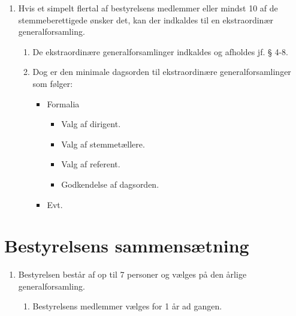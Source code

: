 \documentclass[a4paper]{article}
\newenvironment{stykenum}{
  \begin{enumerate}[%
    label=Stk.~\arabic*., ref=\theenumi~Stk.~\arabic*, start=2]
}{\end{enumerate}}
\begin{document}
\begin{enumerate}[resume*=afsnit]

\item Hvis et simpelt flertal af bestyrelsens medlemmer eller mindst 10 af de
stemmeberettigede ønsker det, kan der indkaldes til en ekstraordinær
generalforsamling.

  \begin{stykenum}

  \item De ekstraordinære generalforsamlinger indkaldes og afholdes jf. § 4-8.

  \item Dog er den minimale dagsorden til ekstraordinære generalforsamlinger
        som følger:

        \begin{itemize}
        \item Formalia
          \begin{itemize}
          \item Valg af dirigent.
          \item Valg af stemmetællere.
          \item Valg af referent.
          \item Godkendelse af dagsorden.
          \end{itemize}
        \item Evt.
        \end{itemize}

  \end{stykenum}

\end{enumerate}


\section*{Bestyrelsens sammensætning}

\begin{enumerate}[resume*=afsnit]

\item Bestyrelsen består af op til 7 personer og vælges på den årlige
generalforsamling.

  \begin{stykenum}

  \item Bestyrelsens medlemmer vælges for 1 år ad gangen.

  \end{stykenum}

\end{enumerate}
\end{document}
